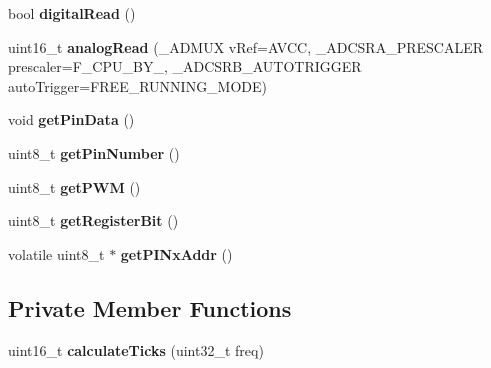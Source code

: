 \begin{DoxyCompactItemize}
bool {\bfseries digital\+Read} ()
\item 
\mbox{\label{classPin_ac678e5fd7f7bc33260eb909178e17367}} 
uint16\+\_\+t {\bfseries analog\+Read} (\+\_\+\+A\+D\+M\+UX v\+Ref=A\+V\+CC, \+\_\+\+A\+D\+C\+S\+R\+A\+\_\+\+P\+R\+E\+S\+C\+A\+L\+ER prescaler=F\+\_\+\+C\+P\+U\+\_\+\+B\+Y\+\_, \+\_\+\+A\+D\+C\+S\+R\+B\+\_\+\+A\+U\+T\+O\+T\+R\+I\+G\+G\+ER auto\+Trigger=F\+R\+E\+E\+\_\+\+R\+U\+N\+N\+I\+N\+G\+\_\+\+M\+O\+DE)
\item 
\mbox{\label{classPin_aa81249603376710b26f6e803db46658e}} 
void {\bfseries get\+Pin\+Data} ()
\item 
\mbox{\label{classPin_aaad2c2cc8ccda03ffe9c07e12323cf4d}} 
uint8\+\_\+t {\bfseries get\+Pin\+Number} ()
\item 
\mbox{\label{classPin_a5a9c1d0f1937b7083779ca4afba2a607}} 
uint8\+\_\+t {\bfseries get\+P\+WM} ()
\item 
\mbox{\label{classPin_af7d88df8c24769198ee8e022ce0ed0fd}} 
uint8\+\_\+t {\bfseries get\+Register\+Bit} ()
\item 
\mbox{\label{classPin_ae2d4f832b081cd2d188151a0c4589f8d}} 
volatile uint8\+\_\+t $\ast$ {\bfseries get\+P\+I\+Nx\+Addr} ()
\end{DoxyCompactItemize}
\subsection*{Private Member Functions}
\begin{DoxyCompactItemize}
\item 
\mbox{\label{classPin_a6a094c4d39ce02a525e77d1951001b53}} 
uint16\+\_\+t {\bfseries calculate\+Ticks} (uint32\+\_\+t freq)
\end{DoxyCompactItemize}
